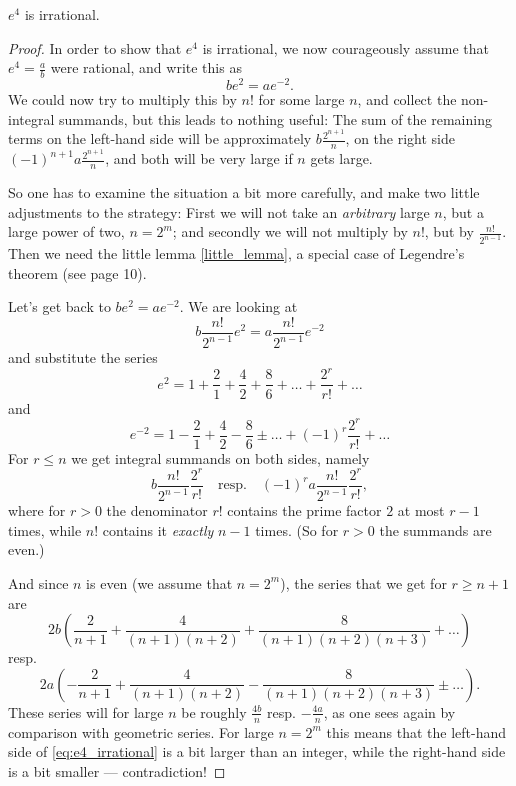 \begin{theorem}
  \label{e_pow_4_irrational}
  \leanok
  $e^4$ is irrational.
\end{theorem}
\begin{proof}
  In order to show that $e^4$ is irrational, we now courageously assume that $e^4 = \frac{a}{b}$ were rational, and write this as
  \[
  b e^2 = a e^{-2}.
  \]
  We could now try to multiply this by $n!$ for some large $n$, and collect the non-integral summands, but this leads to nothing useful:
  The sum of the remaining terms on the left-hand side will be approximately $b \frac{2^{n+1}}{n}$,
  on the right side $(-1)^{n+1} a \frac{2^{n+1}}{n}$, and both will be very large if $n$ gets large.
  
  So one has to examine the situation a bit more carefully, and make two little adjustments to the strategy:
  First we will not take an \emph{arbitrary} large $n$, but a large power of two, $n = 2^m$;
  and secondly we will not multiply by $n!$, but by $\frac{n!}{2^{n-1}}$.
  Then we need the little lemma \ref{little_lemma}, a special case of Legendre's theorem (see page 10).

  Let's get back to $b e^2 = a e^{-2}$.
  We are looking at
  \begin{equation} \label{eq:e4_irrational}
  b \frac{n!}{2^{n-1}} e^2 = a \frac{n!}{2^{n-1}} e^{-2}
  \end{equation}
  and substitute the series
  \[
  e^2 = 1 + \frac{2}{1} + \frac{4}{2} + \frac{8}{6} + \dots + \frac{2^r}{r!} + \dots
  \]
  and
  \[
  e^{-2} = 1 - \frac{2}{1} + \frac{4}{2} - \frac{8}{6} \pm \dots + (-1)^r \frac{2^r}{r!} + \dots
  \]
  For $r \le n$ we get integral summands on both sides, namely
  \[
  b \frac{n!}{2^{n-1}} \frac{2^r}{r!} \quad \text{resp.} \quad (-1)^r a \frac{n!}{2^{n-1}} \frac{2^r}{r!},
  \]
  where for $r > 0$ the denominator $r!$ contains the prime factor $2$ at most $r-1$ times, while $n!$ contains it \emph{exactly} $n-1$ times.
  (So for $r > 0$ the summands are even.)
  
  And since $n$ is even (we assume that $n = 2^m$), the series that we get for $r \ge n+1$ are
  \[
  2b \left( \frac{2}{n+1} + \frac{4}{(n+1)(n+2)} + \frac{8}{(n+1)(n+2)(n+3)} + \dots \right)
  \]
  resp.
  \[
  2a \left( - \frac{2}{n+1} + \frac{4}{(n+1)(n+2)} - \frac{8}{(n+1)(n+2)(n+3)} \pm \dots \right).
  \]
  These series will for large $n$ be roughly $\frac{4b}{n}$ resp. $-\frac{4a}{n}$, as one sees again by comparison with geometric series.
  For large $n = 2^m$ this means that the left-hand side of \eqref{eq:e4_irrational} is a bit larger than an integer,
  while the right-hand side is a bit smaller --- contradiction!
\end{proof}

